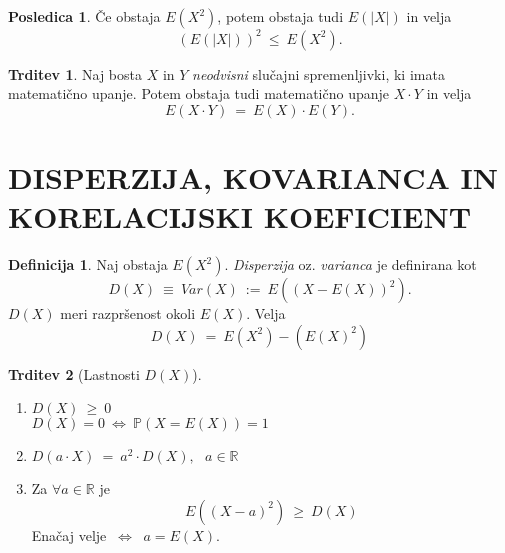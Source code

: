 \documentclass[11pt]{article}
\theoremstyle{definition}
\newtheorem{definicija}{Definicija}[section]
\theoremstyle{definition}
\newtheorem{trditev}{Trditev}[section]
\theoremstyle{definition}
\newtheorem*{posledica}{Posledica}
\begin{document}
\begin{posledica}

Če obstaja $E(X^2)$, potem obstaja tudi $E(|X|)$ in velja
$$(E(|X|))^2 ~\leq~ E(X^2).$$

\end{posledica}
\vspace{0.5cm}

\begin{trditev}

Naj bosta $X$ in $Y$ \textit{neodvisni} slučajni spremenljivki, ki imata matematično upanje. Potem obstaja tudi matematično upanje $X \cdot Y$ in velja
$$E(X \cdot Y) ~=~ E(X) \cdot E(Y).$$

\end{trditev}
\vspace{0.5cm}

\pagebreak


\section{DISPERZIJA, KOVARIANCA IN KORELACIJSKI KOEFICIENT}
\vspace{0.5cm}

\begin{definicija}

Naj obstaja $E(X^2)$. \textit{Disperzija} oz. \textit{varianca} je definirana kot
$$D(X) ~\equiv~ Var(X) ~:=~ E((X - E(X))^2).$$
$D(X)$ meri razpršenost okoli $E(X)$. Velja
$$D(X) ~=~ E(X^2) - (E(X)^2)$$

\end{definicija}
\vspace{0.5cm}

\begin{trditev}[Lastnosti $D(X)$]
~\\
\begin{enumerate}
	\item $D(X) ~\geq~ 0$ \\
	$D(X) = 0 ~\Leftrightarrow~ \mathbb{P}(X = E(X)) = 1$
	\item $D(a \cdot X) ~=~ a^2 \cdot D(X), ~~~a \in \mathbb{R}$
	\item Za $\forall a \in \mathbb{R}$ je 
	$$E((X - a)^2) ~\geq~ D(X)$$
	Enačaj velje $~\Leftrightarrow~$ $a = E(X)$.
\end{enumerate}

\end{trditev}
\vspace{0.5cm}
\end{document}
